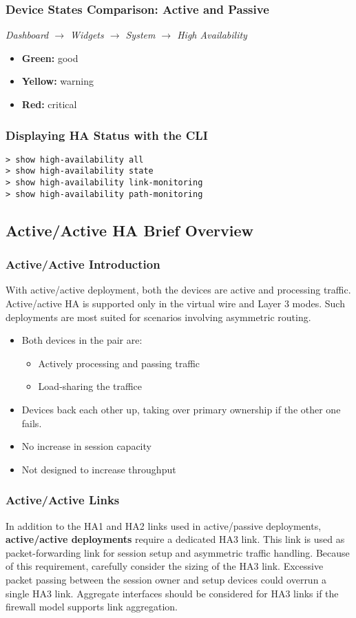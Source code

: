 \subsubsection{Device States Comparison: Active and Passive}
\textit{Dashboard $\rightarrow$ Widgets $\rightarrow$ System $\rightarrow$ High Availability}
\begin{itemize}
    \item \textbf{Green:} good
    \item \textbf{Yellow:} warning
    \item \textbf{Red:} critical
\end{itemize}

\subsubsection{Displaying HA Status with the CLI}
\begin{verbatim}
> show high-availability all
> show high-availability state
> show high-availability link-monitoring
> show high-availability path-monitoring
\end{verbatim}

\subsection{Active/Active HA Brief Overview}
\subsubsection{Active/Active Introduction}
With active/active deployment, both the devices are active and processing traffic.
Active/active HA is supported only in the virtual wire and Layer 3 modes.
Such deployments are most suited for scenarios involving asymmetric routing.
\begin{itemize}
    \item Both devices in the pair are:
        \begin{itemize}
            \item Actively processing and passing traffic
            \item Load-sharing the traffice
        \end{itemize}
    \item Devices back each other up, taking over primary ownership if the other one fails.
    \item No increase in session capacity
    \item Not designed to increase throughput
\end{itemize}
\subsubsection{Active/Active Links}
In addition to the HA1 and HA2 links used in active/passive deployments, \textbf{active/active deployments} require a dedicated HA3 link.
This link is used as packet-forwarding link for session setup and asymmetric traffic handling. 
Because of this requirement, carefully consider the sizing of the HA3 link.
\newline
Excessive packet passing between the session owner and setup devices could overrun a single HA3 link.
Aggregate interfaces should be considered for HA3 links if the firewall model supports link aggregation.